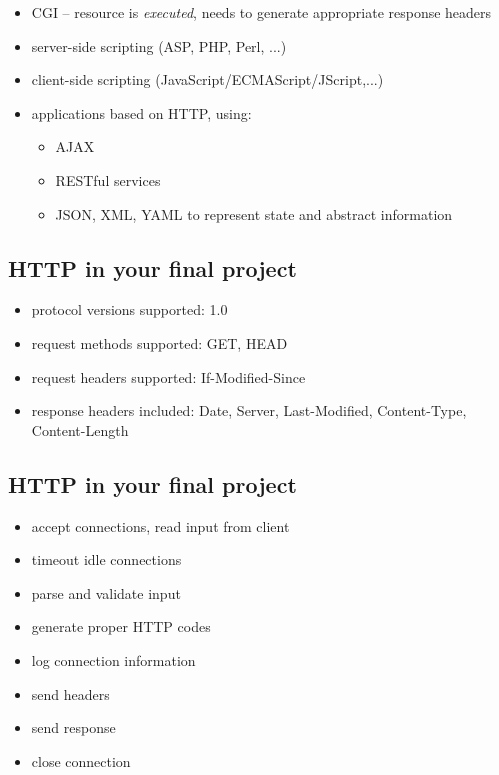 \documentclass[xga]{xdvislides}
\begin{document}
\begin{itemize}
	\item CGI -- resource is {\em executed}, needs to generate
		appropriate response headers
	\item server-side scripting (ASP, PHP, Perl, ...)
	\item client-side scripting (JavaScript/ECMAScript/JScript,...)
	\item applications based on HTTP, using:
		\begin{itemize}
			\item AJAX
			\item RESTful services
			\item JSON, XML, YAML to represent state and
				abstract information
		\end{itemize}
\end{itemize}

\subsection{HTTP in your final project}
\begin{itemize}
	\item protocol versions supported: 1.0
	\item request methods supported: GET, HEAD
	\item request headers supported: If-Modified-Since
	\item response headers included: Date, Server, Last-Modified, Content-Type, Content-Length
\end{itemize}

\subsection{HTTP in your final project}
\begin{itemize}
	\item accept connections, read input from client
	\item timeout idle connections
	\item parse and validate input
	\item generate proper HTTP codes
	\item log connection information
	\item send headers
	\item send response
	\item close connection
\end{itemize}
\end{document}
